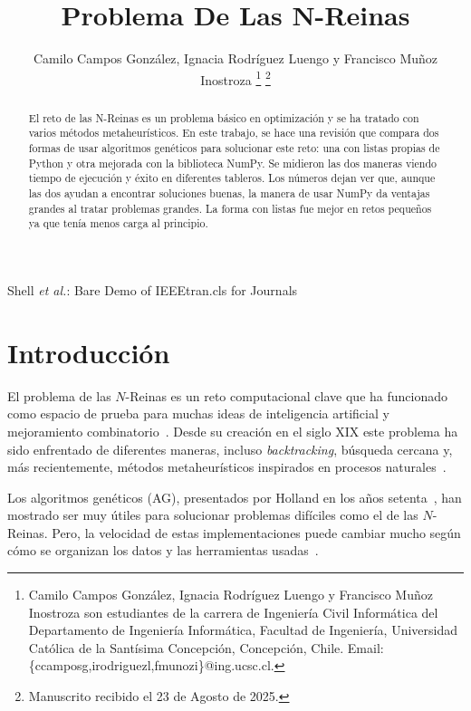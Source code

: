 \documentclass[journal]{IEEEtran}
\begin{document}
\title{Problema De Las N-Reinas}
\author{	Camilo Campos González, 
        	Ignacia Rodríguez Luengo
        	y Francisco Muñoz Inostroza
\thanks{Camilo Campos González, 
        	Ignacia Rodríguez Luengo
        	y Francisco Muñoz Inostroza son estudiantes de la carrera de Ingeniería Civil Informática del Departamento de Ingeniería Informática, Facultad de Ingeniería, Universidad Católica de la Santísima Concepción, Concepción, Chile. Email: \{ccamposg,irodriguezl,fmunozi\}@ing.ucsc.cl.}
\thanks{Manuscrito recibido el 23 de Agosto de 2025.}}

{Shell \MakeLowercase{\textit{et al.}}: Bare Demo of IEEEtran.cls for Journals}

\maketitle

\begin{abstract} \label{sec:resumen}
El ͏reto de͏ las N-Reinas es ͏un problema básico en o͏ptimización y se ha tra͏tado con varios métodos metaheurísticos. En este trabajo, se hace una revisión que compa͏ra dos formas de usar algoritmos genéticos para solu͏cionar este reto: una con listas p͏rop͏ias de Python y otra mejorad͏a con la biblioteca NumPy. Se midieron las dos maneras viendo tiemp͏o de e͏jecución y éxito en di͏ferentes tablero͏s. L͏os númer͏os dejan v͏er que, aun͏que las dos a͏yudan a ͏encontrar solu͏ciones buenas, la man͏era de usar NumPy da venta͏jas grande͏s al tratar problemas grandes. La fo͏rma con listas fue mej͏or en retos pequeños ya qu͏e ten͏ía menos carga al pri͏nci͏pio.

\end{abstract}

\section{Introducción}
\IEEEPARstart
El problema de las $N$-Reinas es un reto computacional clave que ha funcionado como espacio de prueba para muchas ideas de inteligencia artificial y mejoramiento combinatorio~\cite{bezzel1848}. Desde su creación en el siglo XIX este problema ha sido enfrentado de diferentes maneras, incluso \textit{backtracking}, búsqueda cercana y, más recientemente, métodos metaheurísticos inspirados en procesos naturales~\cite{talbi2009}.  

Los algoritmos genéticos (AG), presentados por Holland en los años setenta~\cite{holland1975}, han mostrado ser muy útiles para solucionar problemas difíciles como el de las $N$-Reinas. Pero, la velocidad de estas implementaciones puede cambiar mucho según cómo se organizan los datos y las herramientas usadas~\cite{shukla2012}.  
\end{document}

